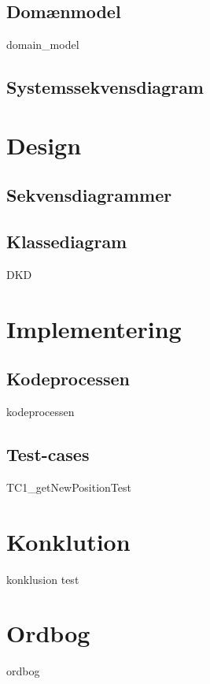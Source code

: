 \documentclass{article}
\begin{document}
{\subsection{Domænmodel}
{domain_model}

\subsection{Systemssekvensdiagram}

\newpage
\section{Design}

\subsection{Sekvensdiagrammer}

\newpage
\subsection{Klassediagram}
{DKD}

\section{Implementering}
\subsection{Kodeprocessen}
{kodeprocessen}

\subsection{Test-cases}
{TC1_getNewPositionTest}



\section{Konklution}
{konklusion}
test

\newpage
\section*{Ordbog}

{ordbog}




\newpage
\cleardoublepage
\printbibliography[heading=bibintoc]
}
\end{document}
